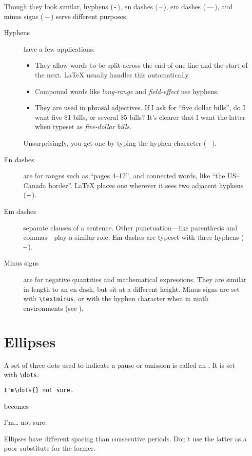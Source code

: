 Though they look similar,
hyphens (\,-\,), en dashes (\,--\,),
em dashes (\,---\,), and minus signs (\,$-$\,)
serve different purposes.
\begin{description}
\item[Hyphens] have a few applications:
    \begin{itemize}[leftmargin=*]
    \item They allow words to be split across the end of one line and the
        start of the next.
        \LaTeX{} usually handles this automatically.
    \item Compound words like \emph{long-range} and \emph{field-effect}
        use hyphens.
    \item They are used in phrasal adjectives.
        If I ask for ``five dollar bills''\punckern,
        do I want five \$1 bills, or several \$5 bills?
        It's clearer that I want the latter when typeset as
        \emph{five-dollar bills}.
    \end{itemize}
    Unsurprisingly, you get one by typing the hyphen character (\,\texttt{-}\,).

\item[En dashes] are for ranges such as ``pages 4--12''\quotekern,
    and connected words, like ``the \mbox{US--Canada} border''\quotekern.
    \LaTeX{} places one wherever it sees two adjacent hyphens
    (\,\texttt{--}\,).

\item[Em dashes] separate clauses of a sentence.
    Other punctuation---like parenthesis and commas---play a similar
    role.
    Em dashes are typeset with three hyphens (\,\texttt{---}\,).

\item[Minus signs] are for negative quantities and
    mathematical expressions.
    They are similar in length to an en dash,
    but sit at a different height.
    Minus signs are set with \verb|\textminus|,
    or with the hyphen character
    when in math environments (see ).
\end{description}

\section{Ellipses}

A set of three dots used to indicate a pause or omission is called an
.
It is set with \verb|\dots|.
\begin{leftfigure}
\begin{lstlisting}
I'm\dots{} not sure.
\end{lstlisting}
\end{leftfigure}
becomes
\begin{leftfigure}
\lm%
I'm\dots{} not sure.
\end{leftfigure}
Ellipses have different spacing than consecutive periods.
Don't use the latter as a poor substitute for the former.

